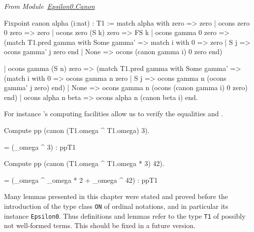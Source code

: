 \vspace{4pt}
\emph{From Module~\href{../theories/html/hydras.Epsilon0.Canon.html\#canon}{Epsilon0.Canon}}

\label{Functions:canonS}
\label{Functions:canon}
\begin{Coqsrc}
  Fixpoint canon alpha (i:nat) : T1 :=
  match alpha with
    zero => zero
  | ocons zero 0 zero  => zero
  | ocons zero (S k) zero  => FS k
  | ocons gamma 0 zero => (match T1.pred gamma with
                            Some gamma' =>
                            match i with 0 => zero
                                    |   S j => ocons gamma' j zero
                            end
                          | None =>
                            ocons (canon gamma i) 0 zero
                           end)
  
  |  ocons gamma (S n) zero =>
     (match T1.pred gamma with
       Some gamma' =>
       (match i with
         0 =>  ocons gamma n zero
       | S j => ocons gamma n (ocons gamma' j zero)
       end)
       | None =>
            ocons gamma n (ocons (canon gamma  i) 0 zero)
      end)
   |  ocons alpha n beta => ocons alpha n (canon beta i)  
end.
\end{Coqsrc}


For instance \coq's computing facilities allow us to verify the equalities\linebreak 
{} and
.


\begin{Coqsrc}
Compute pp (canon (T1.omega ^ T1.omega) 3). 
\end{Coqsrc}

\begin{Coqanswer}
  = (_omega ^ 3)%
     : ppT1
   \end{Coqanswer}
   

\begin{Coqsrc}
Compute pp (canon (T1.omega ^ T1.omega * 3) 42).  
\end{Coqsrc}

\begin{Coqanswer}
    = (_omega ^ _omega * 2 + _omega ^ 42)%
     : ppT1
\end{Coqanswer}

\begin{project}
Many lemmas presented in this chapter were stated and proved before the introduction of 
the type class \texttt{ON} of ordinal notations, and in particular its  instance \texttt{Epsilon0}.
Thus definitions and lemmas refer to the type \texttt{T1} of possibly not well-formed terms.
This should be fixed in  a future version.
\end{project}



